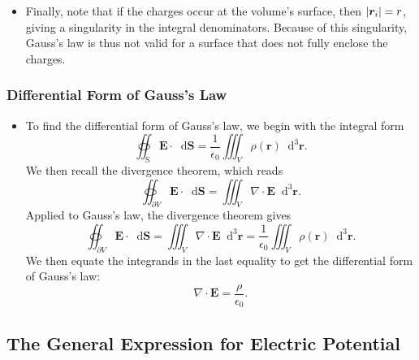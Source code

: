 \documentclass[11pt, a4paper]{article}
\newcommand{\diff}{\mathop{}\!\mathrm{d}} %
\newcommand{\dr}{\diff^{3} \r}  %
\renewcommand{\vec}[1]{\bm{#1}} %
\renewcommand{\r}{\vec{r}}
\newcommand{\E}{\vec{E}} %
\newcommand{\ee}{\epsilon_{0}}  %
\renewcommand{\div}{\nabla \cdot}
\begin{document}
\begin{itemize}
	\item Finally, note that if the charges occur at the volume's surface, then $ \abs{\r_{i}} = r $, giving a singularity in the integral denominators. Because of this singularity, Gauss's law is thus not valid for a surface that does not fully enclose the charges.
\end{itemize}

\subsubsection{Differential Form of Gauss's Law}
\begin{itemize}
	\item To find the differential form of Gauss's law, we begin with the integral form
	\begin{equation*}
		\oiint_{\text{S}} \E \cdot \diff \vec{S} = \frac{1}{\ee}\iiint_{V}\rho(\r) \dr.
	\end{equation*}
	We then recall the divergence theorem, which reads
	\begin{equation*}
		\oiint_{\partial V} \E \cdot \diff \vec{S} = \iiint_{V}\div \E \dr.
	\end{equation*}
	Applied to Gauss's law, the divergence theorem gives
	\begin{equation*}
		\oiint_{\partial V} \E \cdot \diff \vec{S} = \iiint_{V}\div \E \dr = \frac{1}{\ee} \iiint_{V} \rho(\r) \dr.
	\end{equation*}
	We then equate the integrands in the last equality to get the differential form of Gauss's law:
	\begin{equation*}
		\div \E = \frac{\rho}{\ee}.
	\end{equation*}
\end{itemize}

\subsection{The General Expression for Electric Potential}
\end{document}
